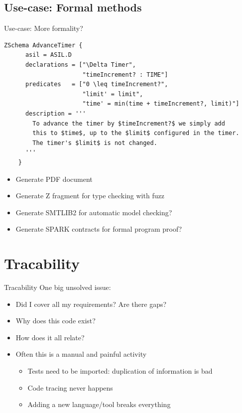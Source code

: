 \documentclass[aspectratio=169]{beamer}
\begin{document}
\subsection{Use-case: Formal methods}
\begin{frame}[fragile]{Use-case: More formality?}
  \begin{lstlisting}[gobble=4]
    ZSchema AdvanceTimer {
      asil = ASIL.D
      declarations = ["\Delta Timer",
                      "timeIncrement? : TIME"]
      predicates   = ["0 \leq timeIncrement?",
                      "limit' = limit",
                      "time' = min(time + timeIncrement?, limit)"]
      description = '''
        To advance the timer by $timeIncrement?$ we simply add
        this to $time$, up to the $limit$ configured in the timer.
        The timer's $limit$ is not changed.
      '''
    }
  \end{lstlisting}
  \pause
  \begin{itemize}
  \item Generate PDF document
    \pause
  \item Generate Z fragment for type checking with fuzz
  \item Generate SMTLIB2 for automatic model checking?
  \item Generate SPARK contracts for formal program proof?
  \end{itemize}
\end{frame}

\section{Tracability}
\begin{frame}{Tracability}
  One big unsolved issue:
  \begin{itemize}
  \item Did I cover all my requirements? Are there gaps?
  \item Why does this code exist?
  \item How does it all relate?
  \item Often this is a manual and painful activity
    \begin{itemize}
    \item Tests need to be imported: duplication of information is bad
    \item Code tracing never happens
    \item Adding a new language/tool breaks everything
    \end{itemize}
  \end{itemize}
\end{frame}
\end{document}
